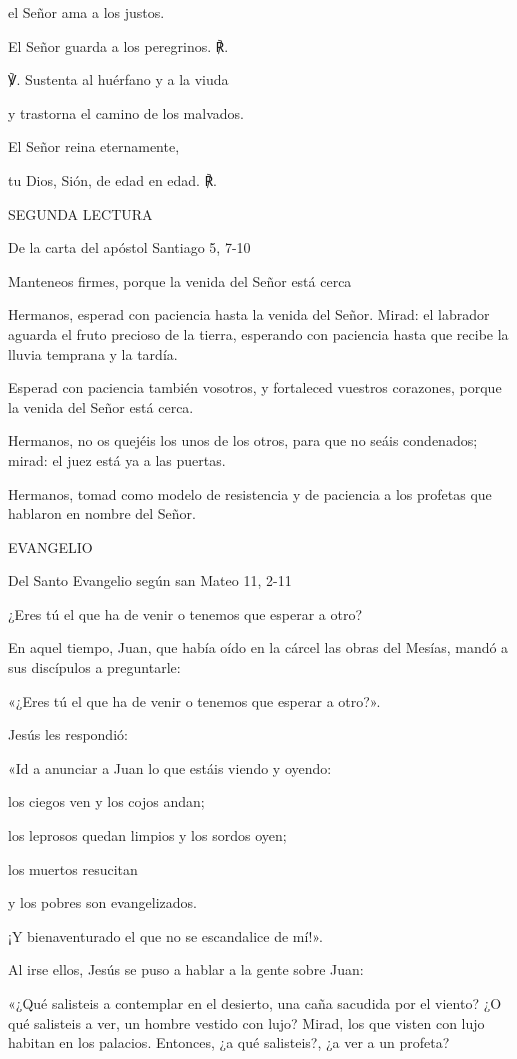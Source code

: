 \documentclass[]{article}
\begin{document}
el Señor ama a los justos.

El Señor guarda a los peregrinos. ℟.

℣. Sustenta al huérfano y a la viuda

y trastorna el camino de los malvados.

El Señor reina eternamente,

tu Dios, Sión, de edad en edad. ℟.

SEGUNDA LECTURA

De la carta del apóstol Santiago 5, 7-10

Manteneos firmes, porque la venida del Señor está cerca

Hermanos, esperad con paciencia hasta la venida del Señor. Mirad: el
labrador aguarda el fruto precioso de la tierra, esperando con paciencia
hasta que recibe la lluvia temprana y la tardía.

Esperad con paciencia también vosotros, y fortaleced vuestros corazones,
porque la venida del Señor está cerca.

Hermanos, no os quejéis los unos de los otros, para que no seáis
condenados; mirad: el juez está ya a las puertas.

Hermanos, tomad como modelo de resistencia y de paciencia a los profetas
que hablaron en nombre del Señor.

EVANGELIO

Del Santo Evangelio según san Mateo 11, 2-11

¿Eres tú el que ha de venir o tenemos que esperar a otro?

En aquel tiempo, Juan, que había oído en la cárcel las obras del Mesías,
mandó a sus discípulos a preguntarle:

«¿Eres tú el que ha de venir o tenemos que esperar a otro?».

Jesús les respondió:

«Id a anunciar a Juan lo que estáis viendo y oyendo:

los ciegos ven y los cojos andan;

los leprosos quedan limpios y los sordos oyen;

los muertos resucitan

y los pobres son evangelizados.

¡Y bienaventurado el que no se escandalice de mí!».

Al irse ellos, Jesús se puso a hablar a la gente sobre Juan:

«¿Qué salisteis a contemplar en el desierto, una caña sacudida por el
viento? ¿O qué salisteis a ver, un hombre vestido con lujo? Mirad, los
que visten con lujo habitan en los palacios. Entonces, ¿a qué
salisteis?, ¿a ver a un profeta?
\end{document}

